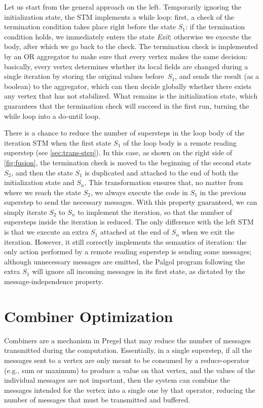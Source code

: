\documentclass{sokendai_thesis} %
\begin{document}
Let us start from the general approach on the left.
Temporarily ignoring the initialization state, the STM implements a while loop:
first, a check of the termination condition takes place right before the state $S_1$: if the termination condition holds, we immediately enters the state \textit{Exit}; otherwise we execute the body, after which we go back to the check.
The termination check is implemented by an OR aggregator to make sure that every vertex makes the same decision:
basically, every vertex determines whether its local fields are changed during a single iteration by storing the original values before~$S_1$, and sends the result (as a boolean) to the aggregator, which can then decide globally whether there exists any vertex that has not stabilized.
What remains is the initialization state, which guarantees that the termination check will succeed in the first run, turning the while loop into a do-until loop.

There is a chance to reduce the number of supersteps in the loop body of the iteration STM when the first state $S_1$ of the loop body is a remote reading superstep (see \autoref{sec:trans-step}).
In this case, as shown on the right side of \autoref{fig:fusion}, the termination check is moved to the beginning of the second state $S_2$, and then the state $S_1$ is duplicated and attached to the end of both the initialization state and $S_n$.
This transformation ensures that, no matter from where we reach the state $S_2$, we always execute the code in $S_1$ in the previous superstep to send the necessary messages.
With this property guaranteed, we can simply iterate $S_2$ to $S_n$ to implement the iteration, so that the number of supersteps inside the iteration is reduced.
The only difference with the left STM is that we execute an extra $S_1$ attached at the end of $S_n$ when we exit the iteration.
However, it still correctly implements the semantics of iteration:
the only action performed by a remote reading superstep is sending some messages;
although unnecessary messages are emitted, the Palgol program following the extra $S_1$ will ignore all incoming messages in its first state, as dictated by the message-independence property.

\section{Combiner Optimization}
\label{sec:combiner}

Combiners are a mechanism in Pregel that may reduce the number of messages transmitted during the computation.
Essentially, in a single superstep, if all the messages sent to a vertex are only meant to be consumed by a reduce-operator (e.g., sum or maximum) to produce a value on that vertex, and the values of the individual messages are not important, then the system can combine the messages intended for the vertex into a single one by that operator, reducing the number of messages that must be transmitted and buffered.
\end{document}
